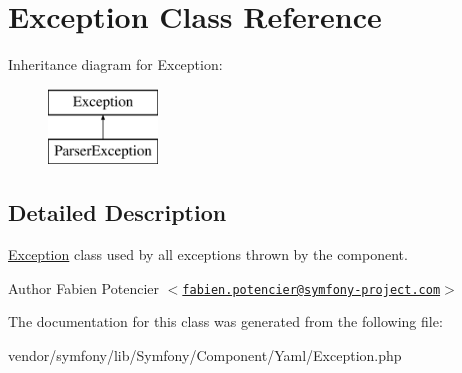 \hypertarget{class_symfony_1_1_component_1_1_yaml_1_1_exception}{
\section{\-Exception \-Class \-Reference}
\label{class_symfony_1_1_component_1_1_yaml_1_1_exception}
}
\-Inheritance diagram for \-Exception\-:\begin{figure}[H]
\begin{center}
\leavevmode
\includegraphics[height=2.000000cm]{class_symfony_1_1_component_1_1_yaml_1_1_exception}
\end{center}
\end{figure}


\subsection{\-Detailed \-Description}
\hyperlink{class_symfony_1_1_component_1_1_yaml_1_1_exception}{\-Exception} class used by all exceptions thrown by the component.

\begin{DoxyAuthor}{\-Author}
\-Fabien \-Potencier $<$\href{mailto:fabien.potencier@symfony-project.com}{\tt fabien.\-potencier@symfony-\/project.\-com}$>$ 
\end{DoxyAuthor}


\-The documentation for this class was generated from the following file\-:\begin{DoxyCompactItemize}
\item 
vendor/symfony/lib/\-Symfony/\-Component/\-Yaml/\-Exception.\-php\end{DoxyCompactItemize}
